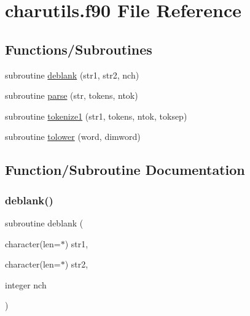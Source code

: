 \hypertarget{charutils_8f90}{}\section{charutils.\+f90 File Reference}
\label{charutils_8f90}
\subsection*{Functions/\+Subroutines}
\begin{DoxyCompactItemize}
\item 
subroutine \hyperlink{charutils_8f90_ae6acc7e2374eb737e74a4edf85c3f1c2}{deblank} (str1, str2, nch)
\item 
subroutine \hyperlink{charutils_8f90_a386868af54eb7d95d214363b9132230f}{parse} (str, tokens, ntok)
\item 
subroutine \hyperlink{charutils_8f90_a4e0b5a3a2a3a429434a954e8af39d758}{tokenize1} (str1, tokens, ntok, toksep)
\item 
subroutine \hyperlink{charutils_8f90_a2bd99695e205166c38b103139c05d3cf}{tolower} (word, dimword)
\end{DoxyCompactItemize}


\subsection{Function/\+Subroutine Documentation}
\mbox{\label{charutils_8f90_ae6acc7e2374eb737e74a4edf85c3f1c2}} 
\subsubsection{\texorpdfstring{deblank()}{deblank()}}
{\footnotesize\ttfamily subroutine deblank (\begin{DoxyParamCaption}\item[{character(len=$\ast$)}]{str1,  }\item[{character(len=$\ast$)}]{str2,  }\item[{integer}]{nch }\end{DoxyParamCaption})}

